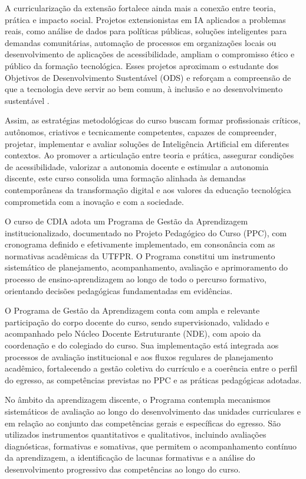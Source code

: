 A curricularização da extensão fortalece ainda mais a conexão entre teoria, prática e impacto social. Projetos extensionistas em IA aplicados a problemas reais, como análise de dados para políticas públicas, soluções inteligentes para demandas comunitárias, automação de processos em organizações locais ou desenvolvimento de aplicações de acessibilidade, ampliam o compromisso ético e público da formação tecnológica. Esses projetos aproximam o estudante dos Objetivos de Desenvolvimento Sustentável (ODS) e reforçam a compreensão de que a tecnologia deve servir ao bem comum, à inclusão e ao desenvolvimento sustentável \cite{UNICEF_ODS_2030}.

Assim, as estratégias metodológicas do curso buscam formar profissionais críticos, autônomos, criativos e tecnicamente competentes, capazes de compreender, projetar, implementar e avaliar soluções de Inteligência Artificial em diferentes contextos. Ao promover a articulação entre teoria e prática, assegurar condições de acessibilidade, valorizar a autonomia docente e estimular a autonomia discente, este curso consolida uma formação alinhada às demandas contemporâneas da transformação digital e aos valores da educação tecnológica comprometida com a inovação e com a sociedade.

O curso de CDIA adota um Programa de Gestão da Aprendizagem institucionalizado, documentado no Projeto Pedagógico do Curso (PPC), com cronograma definido e efetivamente implementado, em consonância com as normativas acadêmicas da UTFPR. O Programa constitui um instrumento sistemático de planejamento, acompanhamento, avaliação e aprimoramento do processo de ensino-aprendizagem ao longo de todo o percurso formativo, orientando decisões pedagógicas fundamentadas em evidências.

O Programa de Gestão da Aprendizagem conta com ampla e relevante participação do corpo docente do curso, sendo supervisionado, validado e acompanhado pelo Núcleo Docente Estruturante (NDE), com apoio da coordenação e do colegiado do curso. Sua implementação está integrada aos processos de avaliação institucional e aos fluxos regulares de planejamento acadêmico, fortalecendo a gestão coletiva do currículo e a coerência entre o perfil do egresso, as competências previstas no PPC e as práticas pedagógicas adotadas.

No âmbito da aprendizagem discente, o Programa contempla mecanismos sistemáticos de avaliação ao longo do desenvolvimento das unidades curriculares e em relação ao conjunto das competências gerais e específicas do egresso. São utilizados instrumentos quantitativos e qualitativos, incluindo avaliações diagnósticas, formativas e somativas, que permitem o acompanhamento contínuo da aprendizagem, a identificação de lacunas formativas e a análise do desenvolvimento progressivo das competências ao longo do curso.

